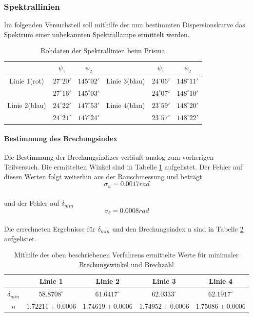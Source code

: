 \documentclass[12pt,a4paper]{article}
\begin{document}
\subsubsection{Spektrallinien}
Im folgenden Versuchsteil soll mithilfe der nun bestimmten Dispersionskurve das Spektrum einer unbekannten Spektrallampe ermittelt werden.
\begin{table}
\begin{tabular}{|c|c|c||c|c|c|}
\hline 
 & $\psi_1$ & $\psi_2$ & & $\psi_1$ & $\psi_2$ \\ 
\hline 
Linie 1(rot) & $27^\circ 20'$ & $145^\circ 02'$ & Linie 3(blau) & $24^\circ 06'$ & $148^\circ 11'$\\ 
\hline 
 & $27^\circ 16'$ & $145^\circ 03'$& & $24^\circ 07'$ & $148^\circ 10'$\\
\hline
\hline 
\hline 
Linie 2(blau) & $24^\circ 22'$ & $147^\circ 53'$ & Linie 4(blau) & $23^\circ 59'$ & $148^\circ 20'$\\ 
\hline 
 & $24^\circ 21'$ & $147^\circ 24'$&  & $23^\circ 57'$ & $148^\circ 22'$\\ 
\hline 
\end{tabular} 
\caption{Rohdaten der Spektrallinien beim Prisma}
\label{tab:Spektrallinien_rohdaten}
\end{table}

\paragraph{Bestimmung des Brechungsindex}
Die Bestimmung der Brechungsindizes verläuft analog zum vorherigen Teilversuch. Die ermittelten Winkel sind in Tabelle \ref{tab:Spektrallinien_rohdaten} aufgelistet.
Der Fehler auf diesen Werten folgt weiterhin aus der Rauschmessung und beträgt
\begin{equation}
\sigma_{\psi} = 0.0017 rad
\end{equation}\\
und der Fehler auf $\delta_{min}$
\begin{equation}
\sigma_{\delta} = 0.0008 rad
\end{equation}\\
Die errechneten Ergebnisse für $\delta_{min}$ und den Brechungsindex n sind in Tabelle \ref{tab:Spekrallinien_Brechungsndex} aufgelistet.

\begin{table}
\begin{tabular}{|c|c|c|c|c|}
\hline
 & Linie 1 & Linie 2 & Linie 3 & Linie 4\\
\hline
$\delta_{min}$ & $58.8708^\circ$ & $61.6417^\circ$ & $62.0333^\circ$ & $62.1917^\circ$\\
\hline
$n$ & $1.72211\pm 0.0006$ & $1.74619\pm 0.0006$ & $1.74952\pm 0.0006$ & $1.75086\pm 0.0006$\\
\hline
\end{tabular}
\caption{Mithilfe des oben beschriebenen Verfahrens ermittelte Werte für minimaler Brechungswinkel und Brechzahl}
\label{tab:Spekrallinien_Brechungsndex}
\end{table}
\end{document}
